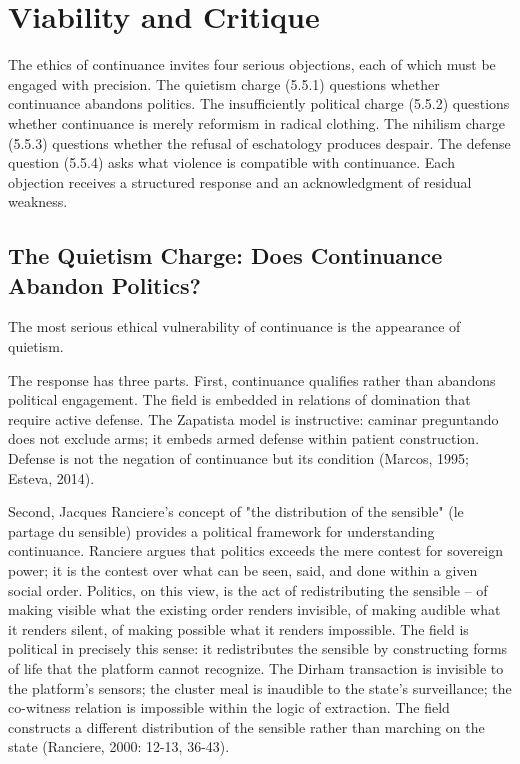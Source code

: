 \section{Viability and Critique}

The ethics of continuance invites four serious objections, each of which must be engaged with precision. The quietism charge (5.5.1) questions whether continuance abandons politics. The insufficiently political charge (5.5.2) questions whether continuance is merely reformism in radical clothing. The nihilism charge (5.5.3) questions whether the refusal of eschatology produces despair. The defense question (5.5.4) asks what violence is compatible with continuance. Each objection receives a structured response and an acknowledgment of residual weakness.

\subsection{The Quietism Charge: Does Continuance Abandon Politics?}

The most serious ethical vulnerability of continuance is the appearance of quietism.

The response has three parts. First, continuance qualifies rather than abandons political engagement. The field is embedded in relations of domination that require active defense. The Zapatista model is instructive: caminar preguntando does not exclude arms; it embeds armed defense within patient construction. Defense is not the negation of continuance but its condition (Marcos, 1995; Esteva, 2014).

Second, Jacques Ranciere's concept of "the distribution of the sensible" (le partage du sensible) provides a political framework for understanding continuance. Ranciere argues that politics exceeds the mere contest for sovereign power; it is the contest over what can be seen, said, and done within a given social order. Politics, on this view, is the act of redistributing the sensible -- of making visible what the existing order renders invisible, of making audible what it renders silent, of making possible what it renders impossible. The field is political in precisely this sense: it redistributes the sensible by constructing forms of life that the platform cannot recognize. The Dirham transaction is invisible to the platform's sensors; the cluster meal is inaudible to the state's surveillance; the co-witness relation is impossible within the logic of extraction. The field constructs a different distribution of the sensible rather than marching on the state (Ranciere, 2000: 12-13, 36-43).

